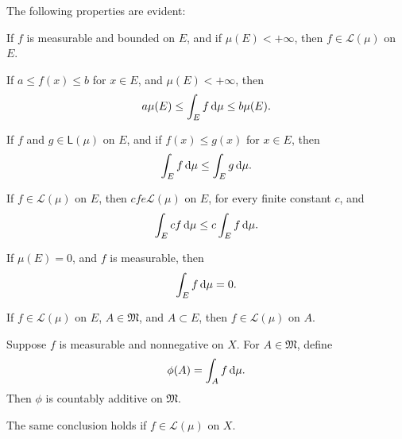 \begin{myRemark}
    \label{myRemark:11.23}
    The following properties are evident:
    \begin{asparaenum}[(a)]
        \item If $f$ is measurable and bounded on $E$, and if $\mu(E) < + \infty$, then $f \in \mathscr{L}(\mu)$ on $E$.
        \item If $a \leq f(x) \leq b$ for $x \in E$, and $\mu(E) < + \infty$, 
        then 
        \begin{equation*}
            a\mu(E) \leq \int_E f \d \mu \leq b\mu(E) .
        \end{equation*}
        \item If $f$ and $g \in \mathsf{L}(\mu)$ on $E$, and if $f(x) \leq g(x)$ for $x \in E$, then
        \begin{equation*}
            \int_E f \d \mu \leq
            \int_E g \d \mu .
        \end{equation*}
        \item  If $f \in \mathscr{L}(\mu)$ on $E$, then $cf e \mathscr{L}(\mu)$ on $E$, for every finite constant $c$, and
        \begin{equation*}
            \int_E cf \d \mu \leq
            c \int_E f \d \mu .            
        \end{equation*}
        \item If $\mu(E) = 0$, and $f$ is measurable, then
        \begin{equation*}
            \int_E f \d \mu = 0.            
        \end{equation*}
        \item If $f \in \mathscr{L}(\mu)$ on $E$, $A \in \mathfrak{M}$, and $A \subset E$, then $f \in \mathscr{L}(\mu)$ on $A$.
    \end{asparaenum}
\end{myRemark}

\begin{thm}
    \label{thm:11.24}
    \begin{asparaenum}[(a)]
        \item Suppose $f$ is measurable and nonnegative on $X$. For $A \in \mathfrak{M}$, define 
        \begin{equation}
            \label{eq:11.57}
            \phi(A) = \int_A f \d \mu .
        \end{equation}
        Then $\phi$ is countably additive on $\mathfrak{M}$.
        \item The same conclusion holds if $f \in \mathscr{L}(\mu)$ on $X$.
    \end{asparaenum}
\end{thm}

